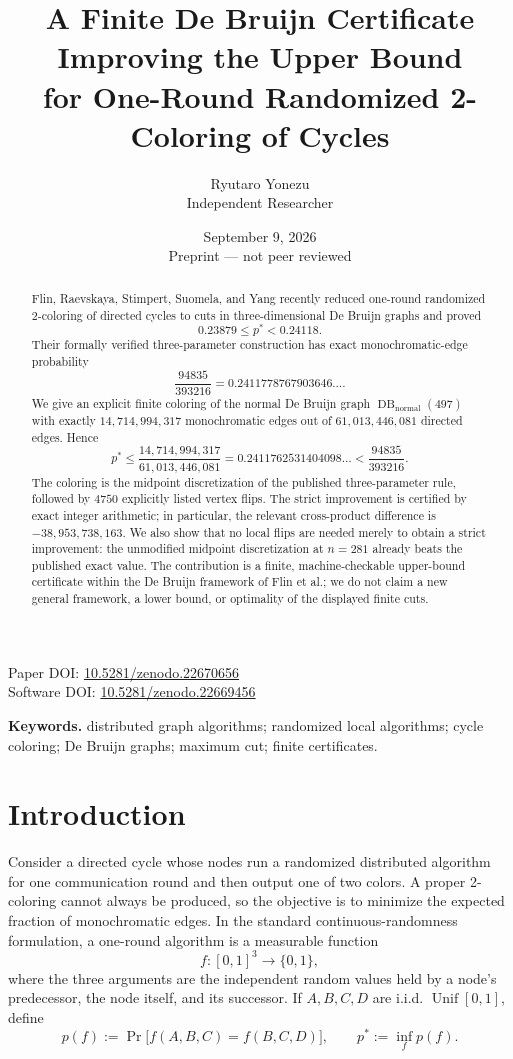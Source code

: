\documentclass[11pt]{article}
\title{\textbf{A Finite De Bruijn Certificate Improving the Upper Bound\\
for One-Round Randomized 2-Coloring of Cycles}}
\author{Ryutaro Yonezu\\Independent Researcher}
\date{September 9, 2026\\\small Preprint --- not peer reviewed}
\newcommand{\DB}{\operatorname{DB}}
\newcommand{\normal}{\mathrm{normal}}
\newcommand{\Unif}{\operatorname{Unif}}
\newcommand{\1}{\mathbf{1}}
\begin{document}
\maketitle

\begin{center}
\small
Paper DOI: \href{https://doi.org/10.5281/zenodo.22670656}{10.5281/zenodo.22670656}\\
Software DOI: \href{https://doi.org/10.5281/zenodo.22669456}{10.5281/zenodo.22669456}
\end{center}

\begin{abstract}
Flin, Raevskaya, Stimpert, Suomela, and Yang recently reduced one-round
randomized 2-coloring of directed cycles to cuts in three-dimensional De
Bruijn graphs and proved
\[
  0.23879\le p^*<0.24118.
\]
Their formally verified three-parameter construction has exact monochromatic-edge
probability
\[
  \frac{94835}{393216}=0.2411778767903646\ldots.
\]
We give an explicit finite coloring of the normal De Bruijn graph
$\DB_{\normal}(497)$ with exactly $14{,}714{,}994{,}317$ monochromatic edges
out of $61{,}013{,}446{,}081$ directed edges.  Hence
\[
  p^*\le
  \frac{14{,}714{,}994{,}317}{61{,}013{,}446{,}081}
  =0.2411762531404098\ldots
  <\frac{94835}{393216}.
\]
The coloring is the midpoint discretization of the published
three-parameter rule, followed by $4750$ explicitly listed vertex flips.
The strict improvement is certified by exact integer arithmetic; in
particular, the relevant cross-product difference is
$-38{,}953{,}738{,}163$.  We also show that no local flips are needed merely
to obtain a strict improvement: the unmodified midpoint discretization at
$n = 281$ already beats the published exact value.  The contribution is a
finite, machine-checkable upper-bound certificate within the De Bruijn
framework of Flin et al.; we do not claim a new general framework, a lower
bound, or optimality of the displayed finite cuts.
\end{abstract}

\noindent\textbf{Keywords.} distributed graph algorithms; randomized local algorithms; cycle coloring; De Bruijn graphs; maximum cut; finite certificates.

\section{Introduction}

Consider a directed cycle whose nodes run a randomized distributed algorithm
for one communication round and then output one of two colors.  A proper
2-coloring cannot always be produced, so the objective is to minimize the
expected fraction of monochromatic edges.  In the standard continuous-randomness
formulation, a one-round algorithm is a measurable function
\[
  f:[0,1]^3\to\{0,1\},
\]
where the three arguments are the independent random values held by a node's
predecessor, the node itself, and its successor.  If $A,B,C,D$ are i.i.d.
$\Unif[0,1]$, define
\[
  p(f):=\Pr\bigl[f(A,B,C)=f(B,C,D)\bigr],
  \qquad
  p^*:=\inf_f p(f).
\]
\end{document}
